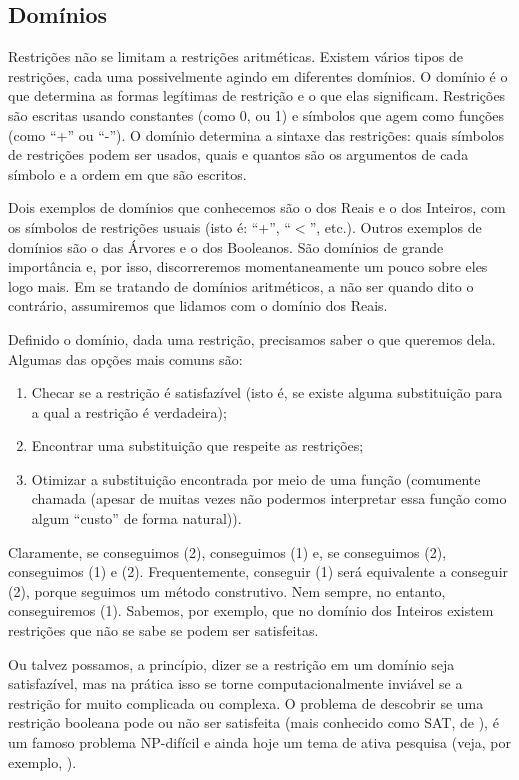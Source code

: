 \documentclass{article}
\begin{document}
\subsection{Domínios}

Restrições não se limitam a restrições aritméticas. Existem vários tipos de restrições, cada uma possivelmente agindo em diferentes domínios.
O domínio é o que determina as formas legítimas de restrição e o que elas significam. Restrições são escritas usando constantes (como 0, ou 1) e símbolos que agem como funções (como ``+'' ou ``-''). O domínio determina a sintaxe das restrições: quais símbolos de restrições podem ser usados, quais e quantos são os argumentos de cada símbolo e a ordem em que são escritos.

Dois exemplos de domínios que conhecemos são o dos Reais e o dos Inteiros, com os símbolos de restrições usuais (isto é: ``+'', ``$<$'', etc.). Outros exemplos de domínios são o das Árvores e o dos Booleanos. São domínios de grande importância e, por isso, discorreremos momentaneamente um pouco sobre eles logo mais. Em se tratando de domínios aritméticos, a não ser quando dito o contrário, assumiremos que lidamos com o domínio dos Reais.

Definido o domínio, dada uma restrição, precisamos saber o que queremos dela. Algumas das opções mais comuns são:
  \begin{enumerate}
    \item Checar se a restrição é satisfazível (isto é, se existe alguma substituição para a qual a restrição é verdadeira);
    \item Encontrar uma substituição que respeite as restrições;
    \item Otimizar a substituição encontrada por meio de uma função (comumente chamada  (apesar de muitas vezes não podermos interpretar essa função como algum ``custo'' de forma natural)).
  \end{enumerate}

  Claramente, se conseguimos (2), conseguimos (1) e, se conseguimos (2), conseguimos (1) e (2). Frequentemente, conseguir (1) será equivalente a conseguir (2), porque seguimos um método construtivo. Nem sempre, no entanto, conseguiremos (1). Sabemos, por exemplo, que no domínio dos Inteiros existem restrições que não se sabe se podem ser satisfeitas.

  Ou talvez possamos, a princípio, dizer se a restrição em um domínio seja satisfazível, mas na prática isso se torne computacionalmente inviável se a
restrição for muito complicada ou complexa. O problema de descobrir se uma restrição booleana pode ou não ser satisfeita (mais conhecido como SAT, de ), é um famoso problema NP-difícil e ainda hoje um tema de ativa pesquisa (veja, por exemplo, \cite{sat}).
\end{document}
